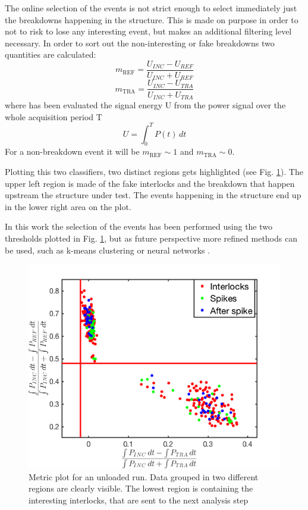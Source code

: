 The online selection of the events is not strict enough to select immediately just the breakdowns happening in the structure. This is made on purpose in order to not to risk to lose any interesting event, but makes an additional filtering level necessary. 
In order to sort out the non-interesting or fake breakdowns two quantities are calculated:
\begin{equation}
m_{\text{REF}}  =  \frac{ U_{INC} -  U_{REF}   }{  U_{INC} + U_{REF}   }
\end{equation}
\begin{equation}
m_{\text{TRA}}  =  \frac{ U_{INC} -  U_{TRA}   }{  U_{INC} +  U_{TRA}   }
\end{equation}
where has been evaluated the signal energy U from the power signal over the whole acquisition period T
\begin{equation}
U = \int_0^T P(t) \, dt
\end{equation}
For a non-breakdown event it will be $m_{\text{REF}} \sim 1$ and $m_{\text{TRA}} \sim 0$.

Plotting this two classifiers, two distinct regions gets highlighted (see Fig. \ref{Metric_plot}). The upper left region is made of the fake interlocks and the breakdown that happen upstream the structure under test. The events happening in the structure end up in the lower right area on the plot. 

In this work the selection of the events has been performed using the two thresholds plotted in Fig. \ref{Metric_plot}, but as future perspective more refined methods can be used, such as k-means clustering or neural networks \cite{ML:book}.

\begin{figure}[h]
\centering 
\includegraphics[scale=0.6]{pictures/metric_plt.png}
\caption{Metric plot for an unloaded run. Data grouped in two different regions are clearly visible. The lowest region is containing the interesting interlocks, that are sent to the next analysis step}
\label{Metric_plot}
\end{figure}


